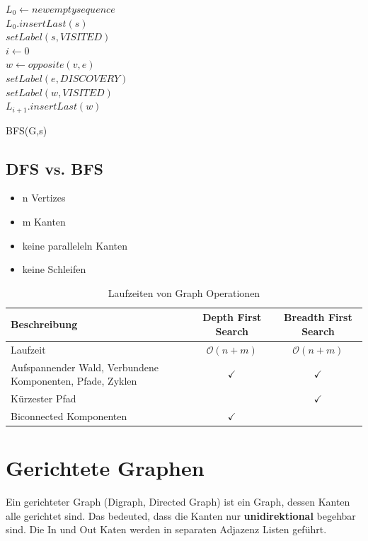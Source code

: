 \begin{algorithm}[H]
	$L_0 \leftarrow new empty sequence$ \\
	$L_0.insertLast(s)$ \\
	$setLabel(s, VISITED)$ \\
	$i \leftarrow 0$ \\
	 {
		{
			{
				 {
					$w \leftarrow opposite(v,e)$ \\
					 {
						$setLabel(e, DISCOVERY)$ \\
						$setLabel(w, VISITED)$ \\
						$L_{i+1}.insertLast(w)$ \\
					}
				}
			}
		}
	}

	\caption{BFS(G,s)}
\end{algorithm}



\subsection{DFS vs. BFS}
\begin{itemize}
	\item n Vertizes
	\item m Kanten
	\item keine paralleleln Kanten
	\item keine Schleifen
\end{itemize}
\begin{table}[h]
	\centering
	\begin{tabu} to \linewidth {X c c}
		\toprule
		Beschreibung & Depth First Search & Breadth First Search \\
		\midrule
		Laufzeit & $\mathcal{O}(n+m)$ & $\mathcal{O}(n+m)$   \\
		Aufspannender Wald, Verbundene Komponenten, Pfade, Zyklen & $\checkmark$ & $\checkmark$  \\
		Kürzester Pfad &  & $\checkmark$   \\
		Biconnected Komponenten & $\checkmark$ &   \\
		\bottomrule
	\end{tabu}
	\caption{Laufzeiten von Graph Operationen}
\end{table}

\section{Gerichtete Graphen}
Ein gerichteter Graph (Digraph, Directed Graph) ist ein Graph, dessen Kanten alle gerichtet sind. Das bedeuted, dass die Kanten nur \textbf{unidirektional} begehbar sind. Die In und Out Katen werden in separaten Adjazenz Listen geführt.  


